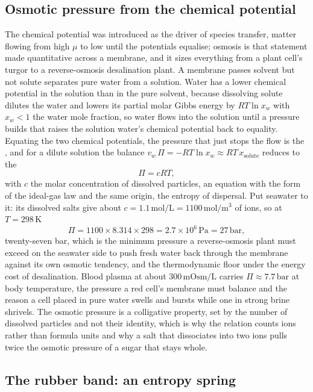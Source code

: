 \subsection{Osmotic pressure from the chemical potential}

The chemical potential was introduced as the driver of species transfer, matter
flowing from high $\mu$ to low until the potentials equalise; osmosis is that
statement made quantitative across a membrane, and it sizes everything from a
plant cell's turgor to a reverse-osmosis desalination plant. A membrane passes
solvent but not solute separates pure water from a solution. Water has a lower
chemical potential in the solution than in the pure solvent, because dissolving
solute dilutes the water and lowers its partial molar Gibbs energy by
$RT\ln x_w$ with $x_w < 1$ the water mole fraction, so water flows into the
solution until a pressure builds that raises the solution water's chemical
potential back to equality. Equating the two chemical potentials, the pressure
that just stops the flow is the , and for a dilute
solution the balance $v_w\,\Pi = -RT\ln x_w \approx RT\,x_{\text{solute}}$
reduces to the 
\[
\Pi = c R T,
\]
with $c$ the molar concentration of dissolved particles, an equation with the
form of the ideal-gas law and the same origin, the entropy of dispersal. Put
seawater to it: its dissolved salts give about $c = 1.1\,\text{mol}/\text{L} =
1100\,\text{mol}/\text{m}^3$ of ions, so at $T = 298\,\si{\kelvin}$
\[
\Pi = 1100 \times 8.314 \times 298 = 2.7\times 10^{6}\,\text{Pa} = 27\,\text{bar},
\]
twenty-seven bar, which is the minimum pressure a reverse-osmosis plant must
exceed on the seawater side to push fresh water back through the membrane against
its own osmotic tendency, and the thermodynamic floor under the energy cost of
desalination. Blood plasma at about $300\,\text{mOsm}/\text{L}$ carries
$\Pi \approx 7.7\,\text{bar}$ at body temperature, the pressure a red cell's
membrane must balance and the reason a cell placed in pure water swells and bursts
while one in strong brine shrivels. The osmotic pressure is a colligative
property, set by the number of dissolved particles and not their identity, which
is why the relation counts ions rather than formula units and why a salt that
dissociates into two ions pulls twice the osmotic pressure of a sugar that stays
whole.

\subsection{The rubber band: an entropy spring}

